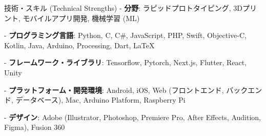 \documentclass[
	11pt, %
]{resume} %
\begin{document}
\begin{rSection}{技術・スキル (Technical Strengths)}
    - \textbf{分野}: ラピッドプロトタイピング, 3Dプリント, モバイルアプリ開発, 機械学習 (ML)

    - \textbf{プログラミング言語}:
    Python, C, C\#, JavaScript, PHP, Swift, Objective-C, Kotlin, Java, Arduino, Processing, Dart, \LaTeX

    - \textbf{フレームワーク・ライブラリ}:
    Tensorflow, Pytorch, Next.js, Flutter, React, Unity
    
    - \textbf{プラットフォーム・開発環境}:
    Android, iOS, Web (フロントエンド, バックエンド, データベース), Mac, Arduino Platform, Raspberry Pi

    - \textbf{デザイン}:
    Adobe (Illustrator, Photoshop, Premiere Pro, After Effects, Audition, Figma), Fusion 360
\end{rSection}
\end{document}
